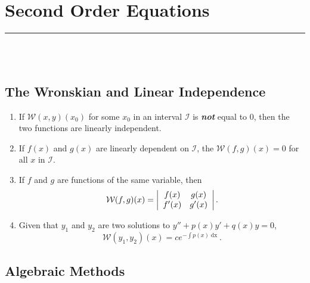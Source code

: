 \documentclass{article}
\newcommand{\dx}{\mathop{dx}}
\newcommand{\Wr}{\mathcal{W}}
\newcommand{\Interval}{\mathcal{I}}
\begin{document}
\section{Second Order Equations}
\hrule
\noindent\\\\
\subsection{The Wronskian and Linear Independence}
\begin{enumerate}
\item If $\Wr(x,y)(x_{0})$ for some $x_{0}$ in an interval $\Interval$ is \textit{\textbf{not}} equal to 0, then the two functions are linearly independent.
\item If $f(x)$ and $g(x)$ are linearly dependent on $\Interval$, the $\Wr(f,g)(x) = 0$ for all $x$ in $\Interval$.
\item If $f$ and $g$ are functions of the same variable, then 
\[
\Wr(f,g)(x) = \left|
\begin{array}{c c}
f(x) & g(x)\\
f'(x) & g'(x)
\end{array}
\right|.
\]
\item Given that $y_{1}$ and $y_{2}$ are two solutions to $y'' + p(x)y' + q(x)y = 0$,
\[
\Wr(y_{1},y_{2})(x) = ce^{-\int p(x)\dx}.
\]
\end{enumerate}
\subsection{Algebraic Methods}
\end{document}
